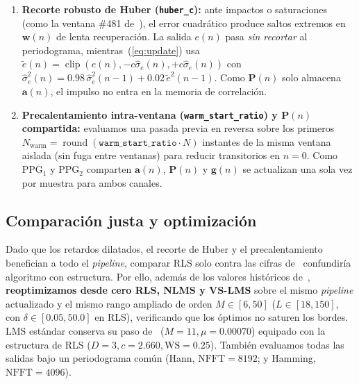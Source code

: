 \documentclass[conference]{IEEEtran}
\begin{document}
\begin{enumerate}
    \item \textbf{Recorte robusto de Huber (\texttt{huber\_c}):} ante impactos o saturaciones (como la ventana \#481 de~\cite{informe1}), el error cuadrático produce saltos extremos en $\mathbf{w}(n)$ de lenta recuperación. La salida $e(n)$ pasa \emph{sin recortar} al periodograma, mientras~(\ref{eq:update}) usa $\tilde{e}(n)=\operatorname{clip}(e(n),-c\hat{\sigma}_e(n),+c\hat{\sigma}_e(n))$ con $\hat{\sigma}_e^2(n)=0.98\,\hat{\sigma}_e^2(n-1)+0.02\,\tilde{e}^2(n-1)$. Como $\mathbf{P}(n)$ solo almacena $\mathbf{a}(n)$, el impulso no entra en la memoria de correlación.

    \item \textbf{Precalentamiento intra-ventana (\texttt{warm\_start\_ratio}) y $\mathbf{P}(n)$ compartida:} evaluamos una pasada previa en reversa sobre los primeros $N_{\text{warm}}=\operatorname{round}(\texttt{warm\_start\_ratio}\cdot N)$ instantes de la misma ventana aislada (sin fuga entre ventanas) para reducir transitorios en $n=0$. Como $\text{PPG}_1$ y $\text{PPG}_2$ comparten $\mathbf{a}(n)$, $\mathbf{P}(n)$ y $\mathbf{g}(n)$ se actualizan una sola vez por muestra para ambos canales.
\end{enumerate}

\subsection{Comparación justa y optimización}
\label{sec:justa}

Dado que los retardos dilatados, el recorte de Huber y el precalentamiento benefician a todo el \textit{pipeline}, comparar RLS solo contra las cifras de~\cite{informe1} confundiría algoritmo con estructura. Por ello, además de los valores históricos de~\cite{informe1}, \textbf{reoptimizamos desde cero RLS, NLMS y VS-LMS} sobre el mismo \textit{pipeline} actualizado y el mismo rango ampliado de orden $M\in[6,50]$ ($L\in[18,150]$, con $\delta\in[0.05,50.0]$ en RLS), verificando que los óptimos no saturen los bordes. LMS estándar conserva su paso de~\cite{informe1} ($M=11,\mu=0.00070$) equipado con la estructura de RLS ($D=3,c=2.660,\text{WS}=0.25$). También evaluamos todas las salidas bajo un periodograma común (Hann, $\text{NFFT}=8192$; y Hamming, $\text{NFFT}=4096$).
\end{document}
